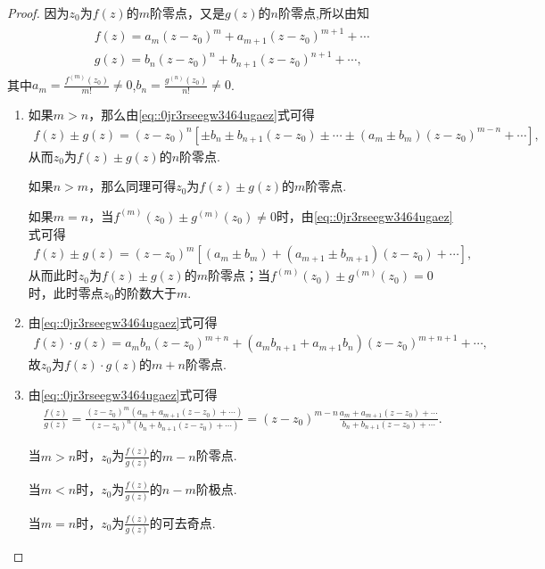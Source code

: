 \documentclass[../../main.tex]{subfiles}%
\begin{document}
\begin{proof}

因为$z_0$为$f(z)$的$m$阶零点，又是$g(z)$的$n$阶零点,所以由知
\begin{align}\label{eq::0jr3rseegw3464ugaez}
\begin{gathered}
f(z)=a_m(z-z_0)^m+a_{m+1}(z-z_0)^{m+1}+\cdots
\\
g(z)=b_n(z-z_0)^n+b_{n+1}(z-z_0)^{n+1}+\cdots,
\end{gathered}
\end{align}
其中$a_m=\frac{f^{\left( m \right)}\left( z_0 \right)}{m!}\neq0$,$b_n=\frac{g^{\left( n \right)}\left( z_0 \right)}{n!}\neq0$.
\begin{enumerate}[(1)]
\item 如果$m>n$，那么由\eqref{eq::0jr3rseegw3464ugaez}式可得
\begin{align*}
f(z)\pm g(z)=(z-z_0)^n\left[\pm b_n\pm b_{n+1}(z-z_0)\pm \cdots\pm (a_m\pm b_m)(z-z_0)^{m-n}+\cdots\right],
\end{align*}
从而$z_0$为$f(z)\pm g(z)$的$n$阶零点.

如果$n>m$，那么同理可得$z_0$为$f(z)\pm g(z)$的$m$阶零点.

如果$m=n$，当$f^{\left( m \right)}\left( z_0 \right) \pm g^{\left( m \right)}\left( z_0 \right) \neq0$时，由\eqref{eq::0jr3rseegw3464ugaez}式可得
\begin{align*}
f(z)\pm g(z)=(z-z_0)^m\left[ \left( a_m\pm b_m \right) +\left( a_{m+1}\pm b_{m+1} \right) (z-z_0)+\cdots \right] ,
\end{align*}
从而此时$z_0$为$f(z)\pm g(z)$的$m$阶零点；当$f^{\left( m \right)}\left( z_0 \right) \pm g^{\left( m \right)}\left( z_0 \right) =0$时，此时零点$z_0$的阶数大于$m$.

\item 由\eqref{eq::0jr3rseegw3464ugaez}式可得
\begin{align*}
f(z)\cdot g(z)=a_mb_n(z-z_0)^{m+n}+(a_mb_{n+1}+a_{m+1}b_n)(z-z_0)^{m+n+1}+\cdots,
\end{align*}
故$z_0$为$f(z)\cdot g(z)$的$m+n$阶零点.

\item 由\eqref{eq::0jr3rseegw3464ugaez}式可得
\begin{align*}
\frac{f(z)}{g(z)}=\frac{(z-z_0)^m(a_m+a_{m+1}(z-z_0)+\cdots)}{(z-z_0)^n(b_n+b_{n+1}(z-z_0)+\cdots)}=(z-z_0)^{m-n}\frac{a_m+a_{m+1}(z-z_0)+\cdots}{b_n+b_{n+1}(z-z_0)+\cdots}.
\end{align*}

当$m>n$时，$z_0$为$\frac{f(z)}{g(z)}$的$m-n$阶零点.

当$m<n$时，$z_0$为$\frac{f(z)}{g(z)}$的$n-m$阶极点.

当$m=n$时，$z_0$为$\frac{f(z)}{g(z)}$的可去奇点.
\end{enumerate}

\end{proof}
\end{document}
